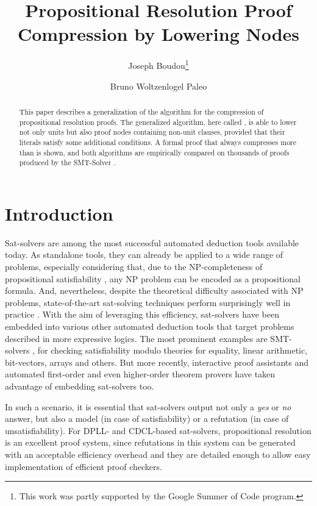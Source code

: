 \documentclass{llncs}
\title{Propositional Resolution Proof Compression by Lowering Nodes}
\author{
  Joseph Boudou\inst{1}\thanks{This work was partly supported by the Google Summer of Code program.}
  \and 
  Bruno Woltzenlogel Paleo\inst{2}
}
\institute{
  Universit\'e Paul Sabatier, Toulouse \\
  \email{joseph.boudou@matabio.net}
  \and 
  Vienna University of Technology \\
  \email{bruno@logic.at}
}
\begin{document}
\maketitle


\begin{abstract}
This paper describes a generalization of the {\LowerUnits} algorithm \cite{LURPI} for the compression
of propositional resolution proofs. The generalized algorithm, here called {\LowerUnivalents}, is
able to lower not only units but also proof nodes containing non-unit clauses, provided that their
literals satisfy some additional conditions. A formal proof that {\LowerUnivalents} always
compresses more than {\LowerUnits} is shown, and both algorithms are empirically compared on
thousands of proofs produced by the SMT-Solver \veriT.
\end{abstract}

\section{Introduction}

Sat-solvers are among the most successful automated deduction tools available today. As standalone
tools, they can already be applied to a wide range of problems, especially considering that, due to
the NP-completeness of propositional satisfiability \cite{cook}, any NP problem can be encoded as a
propositional formula. And, nevertheless, despite the theoretical difficulty associated with NP
problems, state-of-the-art sat-solving techniques perform surprisingly well in practice
\cite{sat-competition}. With the aim of leveraging this efficiency, sat-solvers have been embedded
into various other automated deduction tools that target problems described in more expressive
logics. The most prominent examples are SMT-solvers \cite{veriT}, for checking satisfiability modulo
theories for equality, linear arithmetic, bit-vectors, arrays and others. But more recently,
interactive proof assistants \cite{isabelle-blanchette-boehme} and automated first-order
\cite{spassT?MELIA?iProver?Vampire?} and even higher-order \cite{satallax} theorem provers have
taken advantage of embedding sat-solvers too.

In such a scenario, it is essential that sat-solvers output not only a \emph{yes} or \emph{no}
answer, but also a model (in case of satisfiability) or a refutation (in case of unsatisfiability).
For DPLL- and CDCL-based sat-solvers, propositional resolution is an excellent proof system, since
refutations in this system can be generated with an acceptable efficiency overhead and they are
detailed enough to allow easy implementation of efficient proof checkers.
\end{document}

